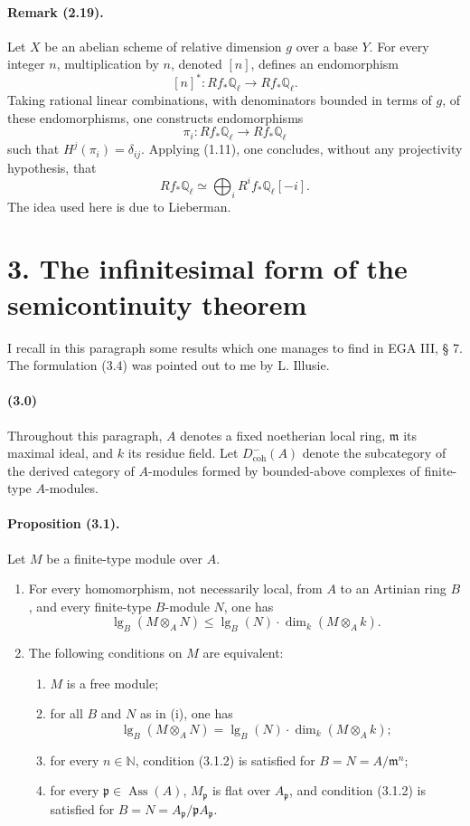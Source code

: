 \documentclass[10pt]{article}
\providecommand{\Ql}{\mathbb Q_\ell}
\providecommand{\N}{\mathbb N}
\begin{document}
\paragraph{Remark (2.19).} Let $X$ be an abelian scheme of relative dimension $g$ over a base $Y$. For every integer $n$, multiplication by $n$, denoted $[n]$, defines an endomorphism
\[
[n]^*:Rf_*\Ql\longrightarrow Rf_*\Ql.
\]
Taking rational linear combinations, with denominators bounded in terms of $g$, of these endomorphisms, one constructs endomorphisms
\[
\pi_i:Rf_*\Ql\longrightarrow Rf_*\Ql
\]
such that $H^j(\pi_i)=\delta_{ij}$. Applying (1.11), one concludes, without any projectivity hypothesis, that
\[
Rf_*\Ql\simeq\bigoplus_iR^if_*\Ql[-i].
\]
The idea used here is due to Lieberman.

\section*{3. The infinitesimal form of the semicontinuity theorem}

I recall in this paragraph some results which one manages to find in EGA III, § 7. The formulation (3.4) was pointed out to me by L. Illusie.

\paragraph{(3.0)} Throughout this paragraph, $A$ denotes a fixed noetherian local ring, $\mathfrak m$ its maximal ideal, and $k$ its residue field. Let $D^-_{\mathrm{coh}}(A)$ denote the subcategory of the derived category of $A$-modules formed by bounded-above complexes of finite-type $A$-modules.

\paragraph{Proposition (3.1).} Let $M$ be a finite-type module over $A$.
\begin{enumerate}[label=(\roman*)]
\item For every homomorphism, not necessarily local, from $A$ to an Artinian ring $B$, and every finite-type $B$-module $N$, one has
\[
\tag{3.1.1}
\operatorname{lg}_B(M\otimes_A N)\le
\operatorname{lg}_B(N)\cdot\dim_k(M\otimes_A k).
\]
\item The following conditions on $M$ are equivalent:
\begin{enumerate}[label=\alph*)]
\item $M$ is a free module;
\item for all $B$ and $N$ as in (i), one has
\[
\tag{3.1.2}
\operatorname{lg}_B(M\otimes_A N)=
\operatorname{lg}_B(N)\cdot\dim_k(M\otimes_A k);
\]
\item for every $n\in\N$, condition (3.1.2) is satisfied for $B=N=A/\mathfrak m^n$;
\item for every $\mathfrak p\in\operatorname{Ass}(A)$, $M_\mathfrak p$ is flat over $A_\mathfrak p$, and condition (3.1.2) is satisfied for $B=N=A_\mathfrak p/\mathfrak pA_\mathfrak p$.
\end{enumerate}
\end{enumerate}
\end{document}
